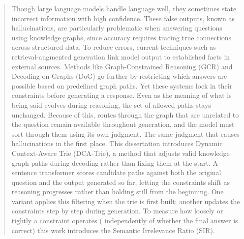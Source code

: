 \documentclass[12pt, onehalfspacing, liststotoc, oneside, parskip, headsepline]{UMaT_Undergrauate_Report_Template_Configurations} %
\begin{document}



\begin{abstract}
  \vspace{10pt}
  \addchaptertocentry{\abstractname} %
  Though large language models handle language well, they sometimes state incorrect information with high confidence. These false outputs, known as hallucinations, are particularly problematic when answering questions using knowledge graphs, since accuracy requires tracing true connections across structured data. To reduce errors, current techniques such as retrieval-augmented generation link model output to established facts in external sources. Methods like Graph-Constrained Reasoning (GCR) and Decoding on Graphs (DoG) go further by restricting which answers are possible based on predefined graph paths. Yet these systems lock in their constraints before generating a response. Even as the meaning of what is being said evolves during reasoning, the set of allowed paths stays unchanged. Because of this, routes through the graph that are unrelated to the question remain available throughout generation, and the model must sort through them using its own judgment. The same judgment that causes hallucinations in the first place. This dissertation introduces Dynamic Context-Aware Trie (DCA-Trie), a method that adjusts valid knowledge graph paths during decoding rather than fixing them at the start. A sentence transformer scores candidate paths against both the original question and the output generated so far, letting the constraints shift as reasoning progresses rather than holding still from the beginning. One variant applies this filtering when the trie is first built; another updates the constraints step by step during generation. To measure how loosely or tightly a constraint operates  ( independently of whether the final answer is correct) this work introduces the Semantic Irrelevance Ratio (SIR).

\end{abstract}



\end{document}
